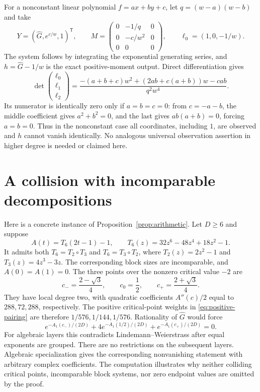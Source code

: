 \documentclass[11pt]{article}
\numberwithin{equation}{section}
\theoremstyle{definition}\newtheorem{definition}[theorem]{Definition}
\theoremstyle{remark}\newtheorem{remark}[theorem]{Remark}
\newcommand{\HH}{\widehat G}
\begin{document}
For a nonconstant linear polynomial $f=ax+by+c$, let
$q=(w-a)(w-b)$ and take
\[
 Y=(\HH,e^{c/w},1)^{\mathsf T},\qquad
 M=\begin{pmatrix}0&-1/q&0\\0&-c/w^2&0\\0&0&0\end{pmatrix},
 \qquad \ell_0=(1,0,-1/w).
\]
The system follows by integrating the exponential generating series,
and $h=\HH-1/w$ is the exact positive-moment output. Direct differentiation
gives
\[
 \det\begin{pmatrix}\ell_0\\\ell_1\\\ell_2\end{pmatrix}
 =\frac{-(a+b+c)w^2+(2ab+c(a+b))w-cab}{q^2w^4}.
\]
Its numerator is identically zero only if $a=b=c=0$:
from $c=-a-b$, the middle coefficient gives $a^2+b^2=0$,
and the last gives $ab(a+b)=0$, forcing $a=b=0$.
Thus in the nonconstant case all coordinates, including $1$, are
observed and $h$ cannot vanish identically. No analogous universal
observation assertion in higher degree is needed or claimed here.

\section{A collision with incomparable decompositions}\label{app:collision}
Here is a concrete instance of Proposition~\ref{prop:arithmetic}.
Let $D\ge6$ and suppose
\[
 A(t)=T_6(2t-1)-1,\qquad
 T_6(z)=32z^6-48z^4+18z^2-1.
\]
It admits both $T_6=T_2\circ T_3$ and $T_6=T_3\circ T_2$, where
$T_2(z)=2z^2-1$ and $T_3(z)=4z^3-3z$. The corresponding block sizes
are incomparable, and $A(0)=A(1)=0$.
The three points over the nonzero critical value $-2$ are
\[
 c_-=\frac{2-\sqrt3}{4},\qquad c_0=\frac12,\qquad
 c_+=\frac{2+\sqrt3}{4}.
\]
They have local degree two, with quadratic coefficients
$A''(c)/2$ equal to $288,72,288$, respectively. The positive
critical-point weights in \eqref{eq:positive-pairing} are therefore
$1/576,1/144,1/576$. Rationality of $\HH$ would force
\[
 e^{-A_1(c_-)/(2D)}+4e^{-A_1(1/2)/(2D)}
                  +e^{-A_1(c_+)/(2D)}=0.
\]
For algebraic layers this contradicts Lindemann--Weierstrass after equal
exponents are grouped. There are no restrictions on the subsequent
layers. Algebraic specialization gives the corresponding nonvanishing
statement with arbitrary complex coefficients. The computation illustrates
why neither colliding critical points, incomparable block systems, nor
zero endpoint values are omitted by the proof.
\end{document}
